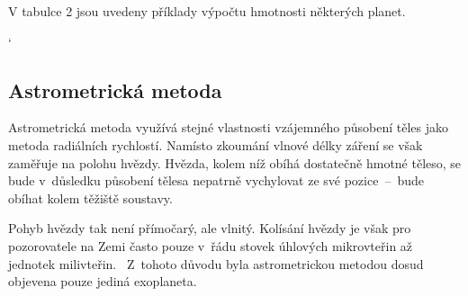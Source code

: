 \documentclass[a4paper,12pt]{article}
\begin{document}
V tabulce 2 jsou uvedeny příklady výpočtu hmotnosti některých planet.

{ %
\catcode`


\clearpage
\subsection{Astrometrická metoda}

Astrometrická metoda využívá stejné vlastnosti vzájemného působení těles jako metoda radiálních rychlostí. Namísto zkoumání vlnové délky záření se však zaměřuje na polohu hvězdy. Hvězda, kolem níž obíhá dostatečně hmotné těleso, se bude v~důsledku působení tělesa nepatrně vychylovat ze své pozice~--~bude obíhat kolem těžiště soustavy.~\cite{methods}


Pohyb hvězdy tak není přímočarý, ale vlnitý. Kolísání hvězdy je však pro pozorovatele na Zemi často pouze v~řádu stovek úhlových mikrovteřin až jednotek milivteřin.~\cite{methods} Z~tohoto důvodu byla astrometrickou metodou dosud objevena pouze jediná exoplaneta.~\cite{nasadata}

}
\end{document}
